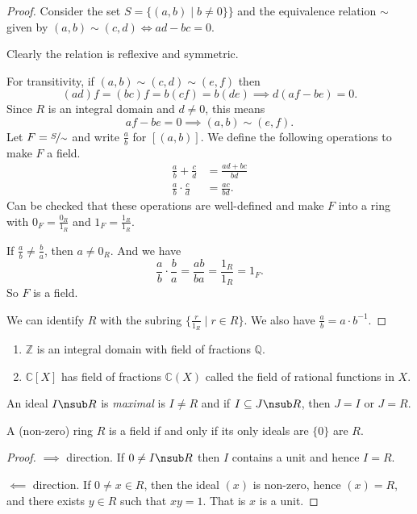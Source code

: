 \begin{proof}
    Consider the set \(S = \{(a,b)\mid b \neq 0\}\}\) and the equivalence relation \(\sim\) given by \((a,b) \sim (c,d) \iff ad - bc = 0\).

    Clearly the relation is reflexive and symmetric.
    
    For transitivity, if \((a,b)\sim (c,d)\sim (e,f)\) then
    \[
        (ad)f = (bc)f = b(cf) = b(de) \implies d(af-be) = 0.
    \]
    Since \(R\) is an integral domain and \(d\neq 0\), this means
    \[af - be = 0 \implies (a,b) \sim (e,f).\]
    Let \(F = \nicefrac{S}{\sim}\) and write \(\frac{a}{b}\) for \([(a,b)]\). We define the following operations to make \(F\) a field.
    \begin{align*}
        \frac{a}{b} + \frac{c}{d} &= \frac{ad + bc}{bd}\\
        \frac{a}{b}\cdot \frac{c}{d} &= \frac{ac}{bd}.
    \end{align*}
    Can be checked that these operations are well-defined and make \(F\) into a ring with \(0_F = \frac{0_R}{1_R}\) and \(1_F = \frac{1_R}{1_R}\).

    If \(\frac{a}{b} \neq \frac{b}{a}\), then \(a \neq 0_R\). And we have
    \[
        \frac{a}{b}\cdot \frac{b}{a} = \frac{ab}{ba}=\frac{1_R}{1_R} = 1_F.
    \]
    So \(F\) is a field.

    We can identify \(R\) with the subring \(\{\frac{r}{1_R}\mid r \in R\}\). We also have \(\frac{a}{b} = a\cdot b^{-1}\).
\end{proof}
\begin{example}
    \leavevmode
    \begin{enumerate}
        \item \(\mathbb{Z}\) is an integral domain with field of fractions \(\mathbb{Q}\).
        \item \(\mathbb{C}[X]\) has field of fractions \(\mathbb{C}(X)\) called the field of rational functions in \(X\).
    \end{enumerate}
\end{example}
\begin{definition}
    An ideal \(I \nsub R\) is \textit{maximal} is \(I \neq R\) and if \(I \subseteq J \nsub R\), then \(J = I\) or \(J = R\).
\end{definition}
\begin{lemma}
    A (non-zero) ring \(R\) is a field if and only if its only ideals are \(\{0\}\) are \(R\).
\end{lemma}
\begin{proof}
    \(\implies\) direction. If \(0 \neq I \nsub R \) then \(I\) contains a unit and hence \(I = R\).

    \(\impliedby\) direction. If \( 0 \neq  x\in R\), then the ideal \((x)\) is non-zero, hence \((x) = R\), and there exists \(y \in R\) such that \(xy = 1\). That is \(x\) is a unit.
\end{proof}

